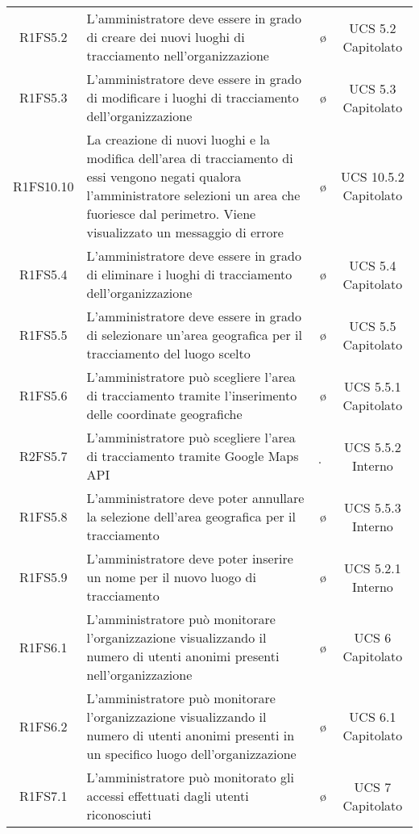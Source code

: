 {\begin{longtable}{ c C{8cm} c c}
R1FS5.2 & L'amministratore deve essere in grado di creare dei nuovi luoghi di tracciamento nell'organizzazione & \o & UCS 5.2 Capitolato\\

R1FS5.3 & L'amministratore deve essere in grado di modificare i luoghi di tracciamento dell'organizzazione  & \o & UCS 5.3 Capitolato\\

R1FS10.10 & La creazione di nuovi luoghi e la modifica dell'area di tracciamento di essi vengono negati qualora l'amministratore selezioni un area che fuoriesce dal perimetro. Viene visualizzato un messaggio di errore & \o & UCS 10.5.2 Capitolato \\

R1FS5.4 & L'amministratore deve essere in grado di eliminare i luoghi di tracciamento dell'organizzazione  & \o & UCS 5.4 Capitolato\\

R1FS5.5 & L'amministratore deve essere in grado di selezionare un'area geografica per il tracciamento del luogo scelto  & \o & UCS 5.5 Capitolato\\

R1FS5.6 &  L'amministratore può scegliere l'area di tracciamento tramite l'inserimento delle coordinate geografiche & \o & UCS 5.5.1 Capitolato\\

R2FS5.7 & L'amministratore può scegliere l'area di tracciamento tramite Google Maps API & \d & UCS 5.5.2 Interno\\

R1FS5.8 & L'amministratore deve poter annullare la selezione dell'area geografica per il tracciamento& \o & UCS 5.5.3 Interno\\

R1FS5.9 & L'amministratore deve poter inserire un nome per il nuovo luogo di tracciamento & \o & UCS 5.2.1 Interno\\

R1FS6.1 & L'amministratore può monitorare l'organizzazione visualizzando il numero di utenti anonimi presenti nell'organizzazione & \o & UCS 6 Capitolato\\

R1FS6.2 & L'amministratore può monitorare l'organizzazione visualizzando il numero di utenti anonimi presenti in un specifico luogo dell'organizzazione  & \o & UCS 6.1 Capitolato\\

R1FS7.1 & L'amministratore può monitorato gli accessi effettuati dagli utenti riconosciuti & \o & UCS 7 Capitolato\\


\end{longtable}}
